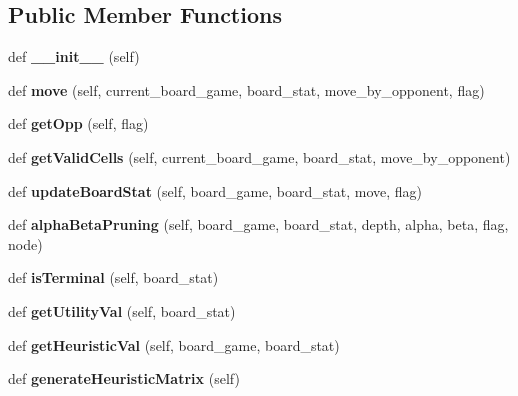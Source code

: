 \subsection*{Public Member Functions}
\begin{DoxyCompactItemize}
\item 
def {\bfseries \+\_\+\+\_\+init\+\_\+\+\_\+} (self)\hypertarget{classteam14_1_1_player14_aa4c4501ba539b6047c5605f8d8b691ba}{}\label{classteam14_1_1_player14_aa4c4501ba539b6047c5605f8d8b691ba}

\item 
def {\bfseries move} (self, current\+\_\+board\+\_\+game, board\+\_\+stat, move\+\_\+by\+\_\+opponent, flag)\hypertarget{classteam14_1_1_player14_a3c576d13c4fd3cbebe07410937c522a1}{}\label{classteam14_1_1_player14_a3c576d13c4fd3cbebe07410937c522a1}

\item 
def {\bfseries get\+Opp} (self, flag)\hypertarget{classteam14_1_1_player14_ad0111ea694d975f6d62d71266f5b5c25}{}\label{classteam14_1_1_player14_ad0111ea694d975f6d62d71266f5b5c25}

\item 
def {\bfseries get\+Valid\+Cells} (self, current\+\_\+board\+\_\+game, board\+\_\+stat, move\+\_\+by\+\_\+opponent)\hypertarget{classteam14_1_1_player14_a113eb0d90ab81e3faf8dca1ab6e0fe14}{}\label{classteam14_1_1_player14_a113eb0d90ab81e3faf8dca1ab6e0fe14}

\item 
def {\bfseries update\+Board\+Stat} (self, board\+\_\+game, board\+\_\+stat, move, flag)\hypertarget{classteam14_1_1_player14_afb40cef5383017eb5c6c38e3bf729b31}{}\label{classteam14_1_1_player14_afb40cef5383017eb5c6c38e3bf729b31}

\item 
def {\bfseries alpha\+Beta\+Pruning} (self, board\+\_\+game, board\+\_\+stat, depth, alpha, beta, flag, node)\hypertarget{classteam14_1_1_player14_a05464411351104bdef64e927194d0174}{}\label{classteam14_1_1_player14_a05464411351104bdef64e927194d0174}

\item 
def {\bfseries is\+Terminal} (self, board\+\_\+stat)\hypertarget{classteam14_1_1_player14_aac4b143e5c11707b66e093cd0c09f81c}{}\label{classteam14_1_1_player14_aac4b143e5c11707b66e093cd0c09f81c}

\item 
def {\bfseries get\+Utility\+Val} (self, board\+\_\+stat)\hypertarget{classteam14_1_1_player14_a048f6817a22e7e7a1e56716cf91becad}{}\label{classteam14_1_1_player14_a048f6817a22e7e7a1e56716cf91becad}

\item 
def {\bfseries get\+Heuristic\+Val} (self, board\+\_\+game, board\+\_\+stat)\hypertarget{classteam14_1_1_player14_a161f310aacad9d80e7ddf305708663b0}{}\label{classteam14_1_1_player14_a161f310aacad9d80e7ddf305708663b0}

\item 
def {\bfseries generate\+Heuristic\+Matrix} (self)\hypertarget{classteam14_1_1_player14_ac64fa497477b4fe863a3651cd4f8bb8e}{}\label{classteam14_1_1_player14_ac64fa497477b4fe863a3651cd4f8bb8e}

\end{DoxyCompactItemize}
